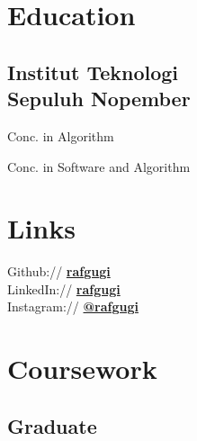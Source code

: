 \documentclass[letterpaper]{deedy-resume} %
\begin{document}
\begin{minipage}[t]{0.33\textwidth} %


\section{Education} 

\subsection[ITS]{Institut Teknologi\\Sepuluh Nopember}

Conc. in Algorithm \\
\sectionspace

Conc. in Software and Algorithm \\
\sectionspace


\section{Links} 

Github:// \href{https://github.com/rafgugi}{\bf rafgugi} \\
LinkedIn:// \href{https://www.linkedin.com/in/rafgugi}{\bf rafgugi} \\
Instagram:// \href{https://instagram.com/rafgugi}{\bf @rafgugi} \\
\sectionspace


\section{Coursework}

\subsection{Graduate}


\end{minipage}
\end{document}
